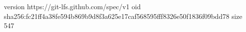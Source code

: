 version https://git-lfs.github.com/spec/v1
oid sha256:fc21ff4a38fe594b869b9d8f3a625e17caf568595fff8326e50f1836f09bdd78
size 547
